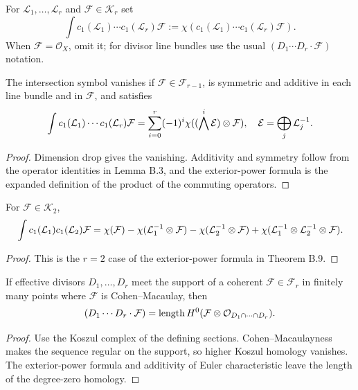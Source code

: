 \begin{definition}\label{kps-def-intersection-number}
For $\mathcal L_1,\ldots,\mathcal L_r$ and $\mathcal F\in\mathcal K_r$ set
\[
 \int c_1(\mathcal L_1)\cdots c_1(\mathcal L_r)\mathcal F
 :=\chi(c_1(\mathcal L_1)\cdots c_1(\mathcal L_r)\mathcal F).
\]
When $\mathcal F=\mathcal O_X$, omit it; for divisor line bundles use the
usual $(D_1\cdots D_r\cdot\mathcal F)$ notation.
\end{definition}

\begin{theorem}\label{kps-thm-first-intersection}
The intersection symbol vanishes if $\mathcal F\in\mathcal F_{r-1}$, is
symmetric and additive in each line bundle and in $\mathcal F$, and satisfies
\[
 \int c_1(\mathcal L_1)\cdots c_1(\mathcal L_r)\mathcal F
 =\sum_{i=0}^r(-1)^i\chi((\bigwedge^i\mathcal E)\otimes\mathcal F),
 \quad\mathcal E=\bigoplus_j\mathcal L_j^{-1}.
\]
\end{theorem}
\begin{proof}
Dimension drop gives the vanishing. Additivity and symmetry follow from the
operator identities in Lemma B.3, and the exterior-power formula is the
expanded definition of the product of the commuting operators.
\end{proof}

\begin{corollary}\label{kps-cor-surface-expansion}
For $\mathcal F\in\mathcal K_2$,
\[
\int c_1(\mathcal L_1)c_1(\mathcal L_2)\mathcal F
 =\chi(\mathcal F)-\chi(\mathcal L_1^{-1}\otimes\mathcal F)-\chi(\mathcal L_2^{-1}\otimes\mathcal F)
 +\chi(\mathcal L_1^{-1}\otimes\mathcal L_2^{-1}\otimes\mathcal F).
\]
\end{corollary}
\begin{proof}
This is the $r=2$ case of the exterior-power formula in Theorem B.9.
\end{proof}

\begin{corollary}\label{kps-cor-CM-intersection}
If effective divisors $D_1,\ldots,D_r$ meet the support of a coherent
$\mathcal F\in\mathcal F_r$ in finitely many points where $\mathcal F$ is
Cohen--Macaulay, then
\[
 (D_1\cdots D_r\cdot\mathcal F)=\operatorname{length} H^0(\mathcal F\otimes\mathcal O_{D_1\cap\cdots\cap D_r}).
\]
\end{corollary}
\begin{proof}
Use the Koszul complex of the defining sections. Cohen--Macaulayness makes
the sequence regular on the support, so higher Koszul homology vanishes. The
exterior-power formula and additivity of Euler characteristic leave the
length of the degree-zero homology.
\end{proof}

